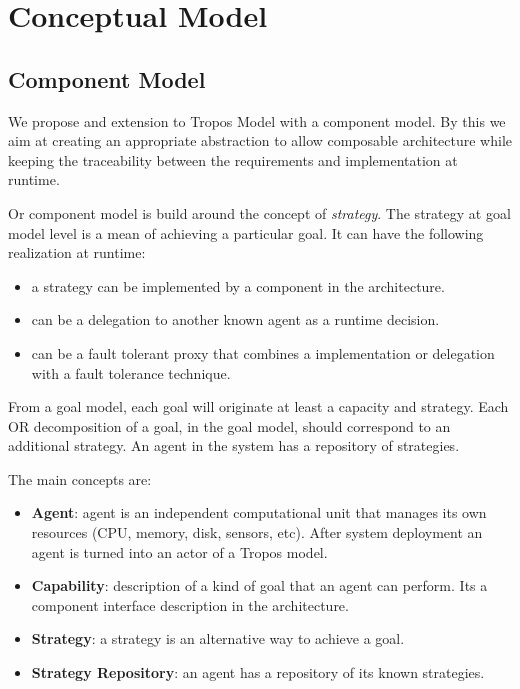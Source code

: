 \section{Conceptual Model}
\label{conceptual_model}

\subsection{Component Model}

We propose and extension to Tropos Model with a component model. By this we aim at creating an appropriate abstraction to allow composable architecture while keeping the traceability between the requirements and implementation at runtime.

Or component model is build around the concept of \textit{strategy}. The strategy at goal model level is a mean of achieving a particular goal. It can have the following realization at runtime:

\begin{itemize}
  \item a strategy can be implemented by a component in the architecture.
  \item can be a delegation to another known agent as a runtime decision.
  \item can be a fault tolerant proxy that combines a implementation or delegation with a fault tolerance technique.
\end{itemize}

From a goal model, each goal will originate at least a capacity and strategy. Each OR decomposition of a goal, in the goal model, should correspond to an additional strategy.
An agent in the system has a repository of strategies.

The main concepts are:

\begin{itemize}
  \item \textbf{Agent}: agent is an independent computational unit that manages its own resources (CPU, memory, disk, sensors, etc). After system deployment an agent is turned into an actor of a Tropos model.
  \item \textbf{Capability}: description of a kind of goal that an agent can perform. Its a component interface description in the architecture.
  \item \textbf{Strategy}: a strategy is an alternative way to achieve a goal.
  \item \textbf{Strategy Repository}: an agent has a repository of its known strategies.
\end{itemize}

